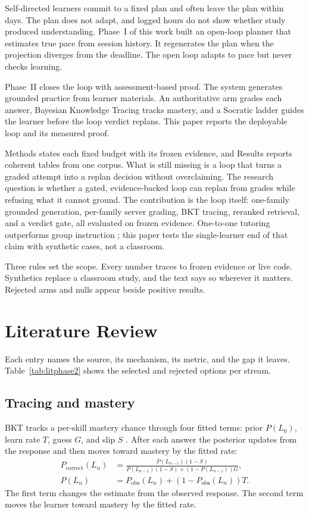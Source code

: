 \documentclass[sn-mathphys,Numbered]{sn-jnl}%
\theoremstyle{thmstyleone}%
\theoremstyle{thmstyletwo}%
\theoremstyle{thmstylethree}%
\begin{document}
Self-directed learners commit to a fixed plan and often leave the plan within days. The plan does not adapt, and logged hours do not show whether study produced understanding. Phase~I of this work built an open-loop planner that estimates true pace from session history. It regenerates the plan when the projection diverges from the deadline. The open loop adapts to pace but never checks learning.

Phase~II closes the loop with assessment-based proof. The system generates grounded practice from learner materials. An authoritative arm grades each answer, Bayesian Knowledge Tracing tracks mastery, and a Socratic ladder guides the learner before the loop verdict replans. This paper reports the deployable loop and its measured proof.

Methods states each fixed budget with its frozen evidence, and Results reports coherent tables from one corpus. What is still missing is a loop that turns a graded attempt into a replan decision without overclaiming. The research question is whether a gated, evidence-backed loop can replan from grades while refusing what it cannot ground. The contribution is the loop itself: one-family grounded generation, per-family server grading, BKT tracing, reranked retrieval, and a verdict gate, all evaluated on frozen evidence. One-to-one tutoring outperforms group instruction \cite{bloom1984}; this paper tests the single-learner end of that claim with synthetic cases, not a classroom.

Three rules set the scope. Every number traces to frozen evidence or live code. Synthetics replace a classroom study, and the text says so wherever it matters. Rejected arms and nulls appear beside positive results.

\section{Literature Review}\label{sec2}

Each entry names the source, its mechanism, its metric, and the gap it leaves. Table~\ref{tab:litphase2} shows the selected and rejected options per stream.

\subsection{Tracing and mastery}\label{subsec21}

BKT tracks a per-skill mastery chance through four fitted terms: prior $P(L_0)$, learn rate $T$, guess $G$, and slip $S$ \cite{corbett1994}. After each answer the posterior updates from the response and then moves toward mastery by the fitted rate:
\begin{align}
P_{\text{correct}}(L_n) &= \frac{P(L_{n-1})(1-S)}{P(L_{n-1})(1-S) + (1-P(L_{n-1}))G}, \nonumber \\
P(L_n) &= P_{\text{obs}}(L_n) + (1-P_{\text{obs}}(L_n))T.
\label{eq:bkt}
\end{align}
The first term changes the estimate from the observed response. The second term moves the learner toward mastery by the fitted rate.
\end{document}
